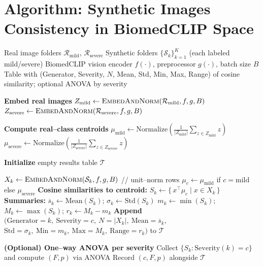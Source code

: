 \documentclass[10pt]{article}
\begin{document}
\section*{Algorithm: Synthetic Images Consistency in BiomedCLIP Space}

\begin{algorithm}[H]
\caption{Algorithm: Compute synthetic image consistency via cosine similarity to real image centroids}
\begin{small}
\begin{algorithmic}[1]
\Require Real image folders $\mathcal{R}_{\text{mild}}$, $\mathcal{R}_{\text{severe}}$
\Require Synthetic folders $\{\mathcal{S}_k\}_{k=1}^K$ (each labeled mild/severe)
\Require BiomedCLIP vision encoder $f(\cdot)$, preprocessor $g(\cdot)$, batch size $B$
\Ensure Table with (Generator, Severity, $N$, Mean, Std, Min, Max, Range) of cosine similarity; optional ANOVA by severity

\State \textbf{Embed real images}
\State $Z_{\text{mild}} \gets \Call{EmbedAndNorm}{\mathcal{R}_{\text{mild}}, f, g, B}$
\State $Z_{\text{severe}} \gets \Call{EmbedAndNorm}{\mathcal{R}_{\text{severe}}, f, g, B}$

\State \textbf{Compute real--class centroids}
\State $\mu_{\text{mild}} \gets \text{Normalize}\!\left(\frac{1}{|Z_{\text{mild}}|}\sum_{z \in Z_{\text{mild}}} z\right)$
\State $\mu_{\text{severe}} \gets \text{Normalize}\!\left(\frac{1}{|Z_{\text{severe}}|}\sum_{z \in Z_{\text{severe}}} z\right)$

\State \textbf{Initialize} empty results table $\mathcal{T}$

  \State $X_k \gets \Call{EmbedAndNorm}{\mathcal{S}_k, f, g, B}$ \hfill // unit--norm rows
  \State $\mu_c \gets \mu_{\text{mild}}$ if $c=\text{mild}$ else $\mu_{\text{severe}}$
  \State \textbf{Cosine similarities to centroid:} $S_k \gets \{\, x^\top \mu_c \;|\; x \in X_k \,\}$
  \State \textbf{Summaries:} $\overline{s}_k \gets \text{Mean}(S_k)$;\; $\sigma_k \gets \text{Std}(S_k)$
  \State \hspace{2.1em} $m_k \gets \min(S_k)$;\; $M_k \gets \max(S_k)$;\; $r_k \gets M_k - m_k$
  \State \textbf{Append} $(\text{Generator}=k,\ \text{Severity}=c,\ N=|X_k|,\ \text{Mean}=\overline{s}_k,$
  \State \hspace{2.1em} $\text{Std}=\sigma_k,\ \text{Min}=m_k,\ \text{Max}=M_k,\ \text{Range}=r_k)$ to $\mathcal{T}$
\EndFor

\State \textbf{(Optional) One--way ANOVA per severity}
  \State Collect $\{S_k : \text{Severity}(k)=c\}$ and compute $(F, p)$ via ANOVA
  \State Record $(c, F, p)$ alongside $\mathcal{T}$
\EndFor


\end{algorithmic}
\end{small}
\end{algorithm}
\end{document}

